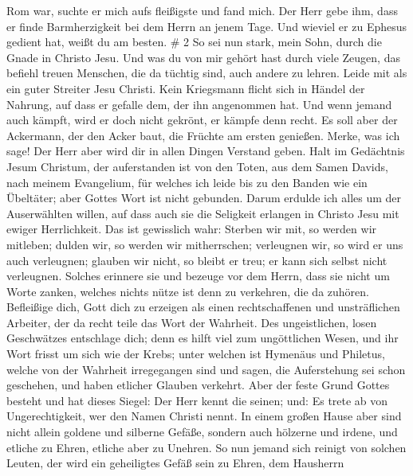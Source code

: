 Rom war, suchte er mich aufs fleißigste und fand mich.  Der
Herr gebe ihm, dass er finde Barmherzigkeit bei dem Herrn an jenem Tage.
Und wieviel er zu Ephesus gedient hat, weißt du am besten. \# 2
 So sei nun stark, mein Sohn, durch die Gnade in Christo
Jesu.  Und was du von mir gehört hast durch viele Zeugen,
das befiehl treuen Menschen, die da tüchtig sind, auch andere zu lehren.
 Leide mit als ein guter Streiter Jesu Christi. 
Kein Kriegsmann flicht sich in Händel der Nahrung, auf dass er gefalle
dem, der ihn angenommen hat.  Und wenn jemand auch kämpft,
wird er doch nicht gekrönt, er kämpfe denn recht.  Es soll
aber der Ackermann, der den Acker baut, die Früchte am ersten genießen.
Merke, was ich sage!  Der Herr aber wird dir in allen Dingen
Verstand geben.  Halt im Gedächtnis Jesum Christum, der
auferstanden ist von den Toten, aus dem Samen Davids, nach meinem
Evangelium,  für welches ich leide bis zu den Banden wie ein
Übeltäter; aber Gottes Wort ist nicht gebunden.  Darum
erdulde ich alles um der Auserwählten willen, auf dass auch sie die
Seligkeit erlangen in Christo Jesu mit ewiger Herrlichkeit.
 Das ist gewisslich wahr: Sterben wir mit, so werden wir
mitleben;  dulden wir, so werden wir mitherrschen;
verleugnen wir, so wird er uns auch verleugnen;  glauben
wir nicht, so bleibt er treu; er kann sich selbst nicht verleugnen.
 Solches erinnere sie und bezeuge vor dem Herrn, dass sie
nicht um Worte zanken, welches nichts nütze ist denn zu verkehren, die
da zuhören.  Befleißige dich, Gott dich zu erzeigen als
einen rechtschaffenen und unsträflichen Arbeiter, der da recht teile das
Wort der Wahrheit.  Des ungeistlichen, losen Geschwätzes
entschlage dich; denn es hilft viel zum ungöttlichen Wesen,
 und ihr Wort frisst um sich wie der Krebs; unter welchen
ist Hymenäus und Philetus,  welche von der Wahrheit
irregegangen sind und sagen, die Auferstehung sei schon geschehen, und
haben etlicher Glauben verkehrt.  Aber der feste Grund
Gottes besteht und hat dieses Siegel: Der Herr kennt die seinen; und: Es
trete ab von Ungerechtigkeit, wer den Namen Christi nennt. 
In einem großen Hause aber sind nicht allein goldene und silberne
Gefäße, sondern auch hölzerne und irdene, und etliche zu Ehren, etliche
aber zu Unehren.  So nun jemand sich reinigt von solchen
Leuten, der wird ein geheiligtes Gefäß sein zu Ehren, dem Hausherrn
